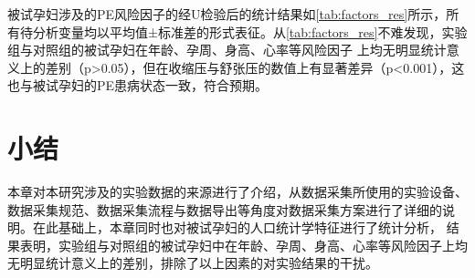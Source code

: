 被试孕妇涉及的PE风险因子的经U检验后的统计结果如\autoref{tab:factors_res}所示，所有待分析变量均以平均值±标准差的形式表征。从\autoref{tab:factors_res}不难发现，实验组与对照组的被试孕妇在年龄、孕周、身高、心率等风险因子
上均无明显统计意义上的差别（p>0.05），但在收缩压与舒张压的数值上有显著差异（p<0.001），这也与被试孕妇的PE患病状态一致，符合预期。
\section{小结}
本章对本研究涉及的实验数据的来源进行了介绍，从数据采集所使用的实验设备、数据采集规范、数据采集流程与数据导出等角度对数据采集方案进行了详细的说明。在此基础上，本章同时也对被试孕妇的人口统计学特征进行了统计分析，
结果表明，实验组与对照组的被试孕妇中在年龄、孕周、身高、心率等风险因子上均无明显统计意义上的差别，排除了以上因素的对实验结果的干扰。